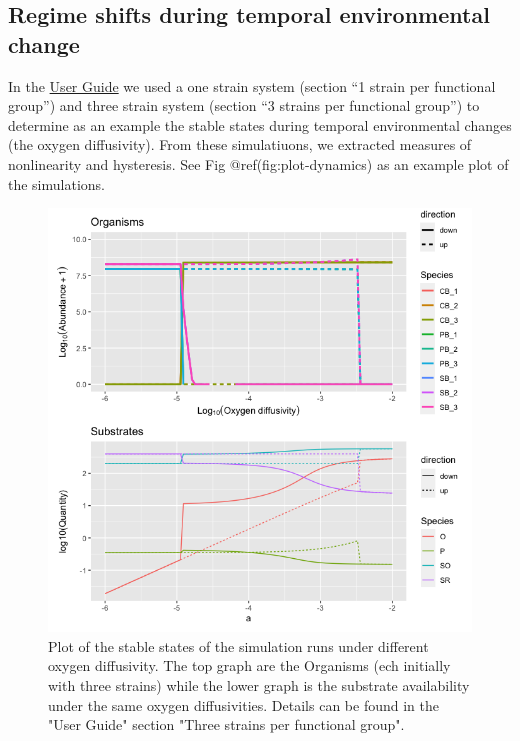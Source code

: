 \documentclass[]{elsarticle} %
\begin{document}
\hypertarget{regime-shifts-during-temporal-environmental-change}{%
\subsection{Regime shifts during temporal environmental
change}\label{regime-shifts-during-temporal-environmental-change}}

In the \href{LINK_NEEDED}{User Guide} we used a one strain system
(section ``1 strain per functional group'') and three strain system
(section ``3 strains per functional group'') to determine as an example
the stable states during temporal environmental changes (the oxygen
diffusivity). From these simulatiuons, we extracted measures of
nonlinearity and hysteresis. See Fig @ref(fig:plot-dynamics) as an
example plot of the simulations.

\begin{figure}

{\centering \includegraphics[width=500px]{figures/ug_three_strains_stable_state} 

}

\caption{Plot of the stable states of the simulation runs under different oxygen diffusivity. The top graph are the Organisms (ech initially with three strains) while the lower graph is the substrate availability under the same oxygen diffusivities. Details can be found in the "User Guide" section "Three strains per functional group".}\label{fig:uc1_stable_state}
\end{figure}
\end{document}

